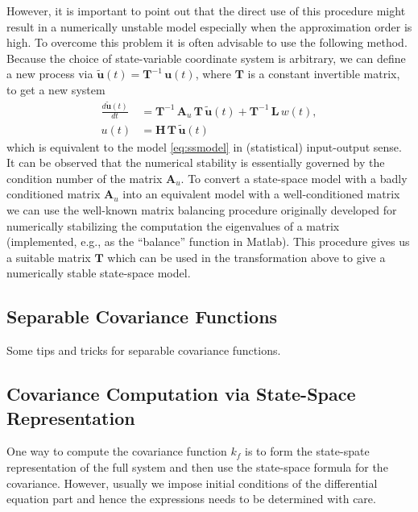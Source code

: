 \documentclass[journal]{IEEEtran}
\newcommand{\simo}[1]{{\color{red}#1}}
\begin{document}
However, it is important to point out that the direct use of this procedure might result in a numerically unstable model especially when the approximation order is high. To overcome this problem it is often advisable to use the following method. 
Because the choice of state-variable coordinate system is arbitrary, we can define a new process via $\tilde{\mathbf{u}}(t) = \mathbf{T}^{-1} \, \mathbf{u}(t)$, where $\mathbf{T}$ is a constant invertible matrix, to get a new system
%
\begin{equation}
\begin{split}
    \frac{d\tilde{\mathbf{u}}(t)}{dt}
    &= \mathbf{T}^{-1} \, \mathbf{A}_u \, \mathbf{T} \, \tilde{\mathbf{u}}(t)
    + \mathbf{T}^{-1} \, \mathbf{L} \, w(t), \\
   u(t) &= \mathbf{H} \, \mathbf{T} \, \tilde{\mathbf{u}}(t)
\end{split}
\end{equation}
%
which is equivalent to the model \eqref{eq:ssmodel} in (statistical) input-output sense. It can be observed that the numerical stability is essentially governed by the condition number of the matrix $\mathbf{A}_u$. To convert a state-space model with a badly conditioned matrix $\mathbf{A}_u$ into an equivalent model with a well-conditioned matrix we can use the well-known matrix balancing procedure
\cite{Parlett+Reinsch:1971}
originally developed for numerically stabilizing the computation the eigenvalues of a matrix (implemented, e.g., as the ``balance'' function in Matlab). This procedure gives us a suitable matrix $\mathbf{T}$ which can be used in the transformation above to give a numerically stable state-space model.

\subsection{Separable Covariance Functions}
%
\simo{Some tips and tricks for separable covariance functions.}




\subsection{Covariance Computation via State-Space Representation}
%
\simo{One way to compute the covariance function $k_f$ is to form the state-spate representation of the full system and then use the state-space formula for the covariance. However, usually we impose initial conditions of the differential equation part and hence the expressions needs to be determined with care.}
\end{document}
